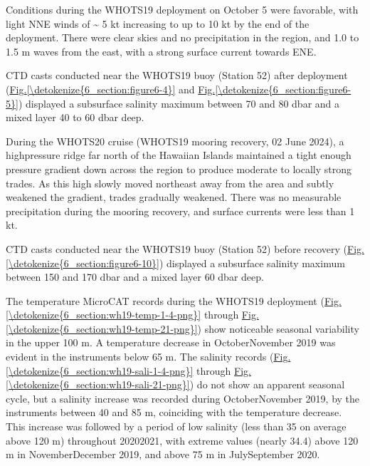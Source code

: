 \documentclass[a4paper,10pt,english,openany,oneside]{sphinxmanual}
\begin{document}
\sphinxAtStartPar
Conditions during the WHOTS\sphinxhyphen{}19 deployment on October 5 were favorable, with
light NNE winds of \textasciitilde{} 5 kt increasing to up to 10 kt by the end of the
deployment. There were clear skies and no precipitation in the region, and 1.0
to 1.5 m waves from the east, with a strong surface current towards ENE.

\sphinxAtStartPar
CTD casts conducted near the WHOTS\sphinxhyphen{}19 buoy (Station 52) after deployment
(\hyperref[\detokenize{6_section:figure6-4}]{Fig.\@ \ref{\detokenize{6_section:figure6-4}}} and \hyperref[\detokenize{6_section:figure6-5}]{Fig.\@ \ref{\detokenize{6_section:figure6-5}}}) displayed a subsurface
salinity maximum between 70 and 80 dbar and a mixed layer 40 to 60 dbar deep.

\sphinxAtStartPar
During the WHOTS\sphinxhyphen{}20 cruise (WHOTS\sphinxhyphen{}19 mooring recovery, 02 June 2024), a high\sphinxhyphen{}pressure ridge far north of the Hawaiian Islands maintained a
tight enough pressure gradient down across the region to produce moderate to
locally strong trades. As this high slowly moved northeast away from the area
and subtly weakened the gradient, trades gradually weakened. There was no
measurable precipitation during the mooring recovery, and surface
currents were less than 1 kt.

\sphinxAtStartPar
CTD casts conducted near the WHOTS\sphinxhyphen{}19 buoy (Station 52) before recovery
(\hyperref[\detokenize{6_section:figure6-10}]{Fig.\@ \ref{\detokenize{6_section:figure6-10}}}) displayed a subsurface salinity maximum between 150 and
170 dbar and a mixed layer 60 dbar deep.

\sphinxAtStartPar
The temperature MicroCAT records during the WHOTS\sphinxhyphen{}19 deployment
(\hyperref[\detokenize{6_section:wh19-temp-1-4-png}]{Fig.\@ \ref{\detokenize{6_section:wh19-temp-1-4-png}}} through \hyperref[\detokenize{6_section:wh19-temp-21-png}]{Fig.\@ \ref{\detokenize{6_section:wh19-temp-21-png}}}) show
noticeable seasonal variability in the upper 100 m. A temperature decrease in
October\sphinxhyphen{}November 2019 was evident in the instruments below 65 m. The salinity
records (\hyperref[\detokenize{6_section:wh19-sali-1-4-png}]{Fig.\@ \ref{\detokenize{6_section:wh19-sali-1-4-png}}} through \hyperref[\detokenize{6_section:wh19-sali-21-png}]{Fig.\@ \ref{\detokenize{6_section:wh19-sali-21-png}}}) do
not show an apparent seasonal cycle, but a salinity increase was recorded
during October\sphinxhyphen{}November 2019, by the instruments between 40 and 85 m,
coinciding with the temperature decrease. This increase was followed by a
period of low salinity (less than 35 on average above 120 m) throughout
2020\sphinxhyphen{}2021, with extreme values (nearly 34.4) above 120 m in November\sphinxhyphen{}December
2019, and above 75 m in July\sphinxhyphen{}September 2020.
\end{document}
